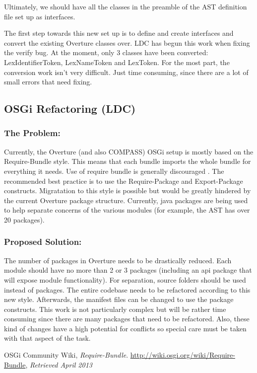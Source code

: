 \documentclass[11pt]{report}
\begin{document}
    Ultimately, we should have all the classes in the preamble of the AST definition
    file set up as interfaces.

    The first step towards this new set up is to define and create interfaces and
    convert the existing Overture classes over. LDC has begun this work when fixing
    the verify bug. At the moment, only 3 classes have been converted:
    \textsf{LexIdentifierToken}, \textsf{LexNameToken} and \textsf{LexToken}. For 
    the most part, the conversion work isn't very difficult. Just time consuming, 
    since there are a lot of small errors that need fixing.
    
    


    \subsection*{OSGi Refactoring (LDC)}
    \label{ssec:osgi} 

    \subsubsection{The Problem:}
    Currently, the Overture (and also COMPASS) OSGi setup is mostly based on the 
    \textsf{Require-Bundle} style. This means that each bundle imports the whole 
    bundle for everything it needs. Use of require bundle is generally discouraged
    \cite{osgi2013}. The recommended best practice is to use the 
    \textsf{Require-Package} and \textsf{Export-Package} constructs. Migratation
    to this style is possible but would be greatly hindered by the current Overture
    package structure. Currently, java packages are being used to help separate
    concerns of the various modules (for example, the AST has over 20 packages).

    \subsubsection{Proposed Solution:}
    The number of packages in Overture needs to be drastically reduced. Each
    module should have no more than 2 or 3 packages (including an api package
    that will expose module functionality). For separation, source folders
    should be used instead of packages. The entire codebase needs to be
    refactored according to this new style. Afterwards, the manifest files can
    be changed to use the package constructs. This work is not particularly
    complex but will be rather time consuming since there are many packages
    that need to be refactored. Also, these kind of changes have a high
    potential for conflicts so special care must be taken with that aspect of
    the task.




    \begin{thebibliography}{9}

  OSGi Community Wiki,
  \emph{Require-Bundle}.
  \url{http://wiki.osgi.org/wiki/Require-Bundle},
  \emph{Retrieved April 2013}

\end{thebibliography}
\end{document}
